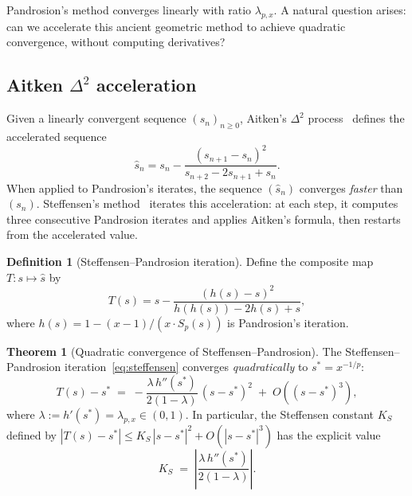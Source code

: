 \documentclass[11pt,a4paper]{article}
\theoremstyle{definition}
\newtheorem{definition}{Definition}[section]
\newtheorem{theorem}{Theorem}[section]
\begin{document}
Pandrosion's method converges linearly with ratio $\lambda_{p,x}$. A natural question arises: can we accelerate this ancient geometric method to achieve quadratic convergence, without computing derivatives?

\subsection{Aitken \texorpdfstring{$\Delta^2$}{Delta-squared} acceleration}

Given a linearly convergent sequence $(s_n)_{n \geq 0}$, Aitken's $\Delta^2$ process~\cite{stoer} defines the accelerated sequence
\[
  \hat{s}_n = s_n - \frac{(s_{n+1} - s_n)^2}{s_{n+2} - 2s_{n+1} + s_n}.
\]
When applied to Pandrosion's iterates, the sequence $(\hat{s}_n)$ converges \emph{faster} than $(s_n)$. Steffensen's method~\cite{steffensen} iterates this acceleration: at each step, it computes three consecutive Pandrosion iterates and applies Aitken's formula, then restarts from the accelerated value.

\begin{definition}[Steffensen--Pandrosion iteration]
\label{def:steffensen}
Define the composite map $T : s \mapsto \hat{s}$ by
\begin{equation}
  \label{eq:steffensen}
  T(s) = s - \frac{(h(s) - s)^2}{h(h(s)) - 2h(s) + s},
\end{equation}
where $h(s) = 1 - (x-1)/(x \cdot S_p(s))$ is Pandrosion's iteration.
\end{definition}

\begin{theorem}[Quadratic convergence of Steffensen--Pandrosion]
\label{thm:steffensen}
The Steffensen--Pandrosion iteration~\eqref{eq:steffensen} converges \emph{quadratically} to $s^* = x^{-1/p}$:
\[
  T(s) - s^* \;=\; -\frac{\lambda\, h''(s^*)}{2(1 - \lambda)}\,(s - s^*)^2 \;+\; O((s - s^*)^3),
\]
where $\lambda := h'(s^*) = \lambda_{p,x} \in (0, 1)$. In particular, the Steffensen constant $K_S$ defined by $|T(s) - s^*| \leq K_S\,|s - s^*|^2 + O(|s - s^*|^3)$ has the explicit value
\begin{equation}
  \label{eq:K_steffensen}
  K_S \;=\; \left|\frac{\lambda\, h''(s^*)}{2(1 - \lambda)}\right|.
\end{equation}
\end{theorem}
\end{document}
